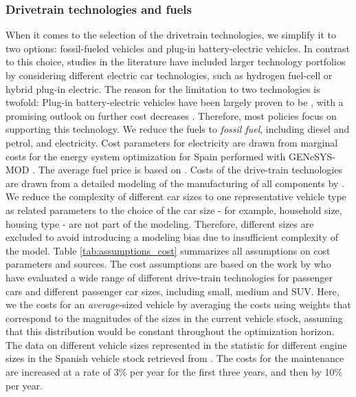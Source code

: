 \documentclass[preprint,review,11pt, authoryear]{elsarticle}
\begin{document}
                



 \subsubsection{Drive\deleted{-}train technologies and fuels}
        
            When it comes to the selection of the drive\deleted{-}train technologies, we simplify it to two options: fossil-fueled vehicles and plug-in battery-electric vehicles. In contrast to this choice, studies in the literature have included larger technology portfolios by considering different electric car technologies, such as hydrogen fuel-cell or hybrid plug-in electric. The reason for the limitation to two technologies is twofold: Plug-in battery-electric vehicles have been largely proven to be , with a promising outlook on further cost decreases \citep{GRUBE2021103110}. Therefore, most policies focus on supporting this technology. We reduce the fuels to \textit{fossil fuel}, including diesel and petrol, and electricity. Cost parameters for electricity are drawn from marginal costs for the energy system optimization for Spain performed with GENeSYS-MOD \citep{loffler2025european}. The average fuel price is based on \citep{MARTIN2023113637}. 
            Costs of the drive-train technologies are drawn from a detailed modeling of the manufacturing of all components by \citep{GRUBE2021103110}. We reduce the complexity of different car sizes to one representative vehicle type as related parameters to the choice of the car size - for example, household size, housing type \citep{jia2023preferences} - are not part of the modeling. Therefore, different sizes are excluded to avoid introducing a modeling bias due to insufficient complexity of the model. Table \ref{tab:assumptions_cost} summarizes all assumptions on cost parameters and sources. The cost assumptions are based on the work by \citet{GRUBE2021103110}  who have evaluated a wide range of different drive-train technologies for passenger cars and different passenger car sizes, including small, medium\added{,} and SUV. Here, we  the costs for an \textit{average}-sized vehicle by averaging the costs using weights that correspond to the magnitudes of the sizes in the current vehicle stock, assuming that this distribution would be constant throughout the optimization horizon. The data on different vehicle sizes represented in the statistic for different engine sizes in the Spanish vehicle stock  retrieved from \citep{dgt2023}. 
            The costs for the maintenance are increased at a rate of 3\% per year for the first three years, and then by 10\% per year.
            
\end{document}
